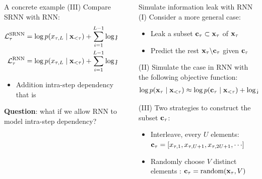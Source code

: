 \documentclass[final]{beamer}
\newlength{\sepwidth}
\newlength{\colwidth}
\newcommand{\separatorcolumn}{\begin{column}{\sepwidth}\end{column}}
\begin{document}
\begin{frame}[t]
\begin{columns}[t]
\begin{column}{\colwidth}
\begin{alertblock}{A concrete example}
 	(III) Compare SRNN with RNN:
 	\begin{align*}
 	\mathcal{L}^\text{SRNN}_\tau
 	&= \log p(x_{\tau,L} \mid {\mathbf{x}}_{<\tau}) + \sum_{i=1}^{L-1} \log p(x_{\tau,i} \mid {\color{magenta}x_{\tau,L}}, {\mathbf{x}}_{<\tau}) \\
 	\mathcal{L}^\text{RNN}_\tau
 	&= \log p(x_{\tau,L} \mid {\mathbf{x}}_{<\tau}) + \sum_{i=1}^{L-1} \log p(x_{\tau,i} \mid {\mathbf{x}}_{<\tau})
 	\end{align*}
 	\begin{itemize}
 		\item Addition intra-step dependency  that is 
 	\end{itemize}
\end{alertblock}

\textbf{Question}: what if we allow RNN to model intra-step dependency?

\end{column}

\separatorcolumn

\begin{column}{\colwidth}

\begin{block}{Simulate information leak with RNN}
	(I) Consider a more general case:
	\begin{itemize}
	\item Leak a subset ${\mathbf{c}}_\tau \subset {\mathbf{x}}_\tau$ of ${\mathbf{x}}_\tau$
	\item Predict the rest ${\mathbf{x}}_\tau \backslash {\mathbf{c}}_\tau$ given ${\mathbf{c}}_\tau$
	\end{itemize}
	  
	(II) Simulate the case in RNN with the following objective function:
	\begin{align*}
		\log p({\mathbf{x}}_{\tau} \mid {\mathbf{x}}_{<\tau}) \approx \log p({\mathbf{c}}_{\tau} \mid {\mathbf{x}}_{<\tau}) + \log p({\mathbf{x}}_{\tau} \backslash {\mathbf{c}}_{\tau} \mid {\mathbf{x}}_{<\tau}, {\mathbf{c}}_{\tau})
	\end{align*}
	
	(III) Two strategies to construct the subset ${\mathbf{c}}_{\tau}$:
	\begin{itemize}
		\item Interleave, every $U$ elements: ${\mathbf{c}}_{\tau} = \left[ {x_{\tau,1}, x_{\tau,U+1}, x_{\tau,2U+1}, \cdots } \right]$
		\item Randomly choose $V$ distinct elements : ${\mathbf{c}}_{\tau} = \text{random}({\mathbf{x}}_{\tau}, V)$
	\end{itemize}


\end{block}
\end{column}
\end{columns}
\end{frame}
\end{document}
